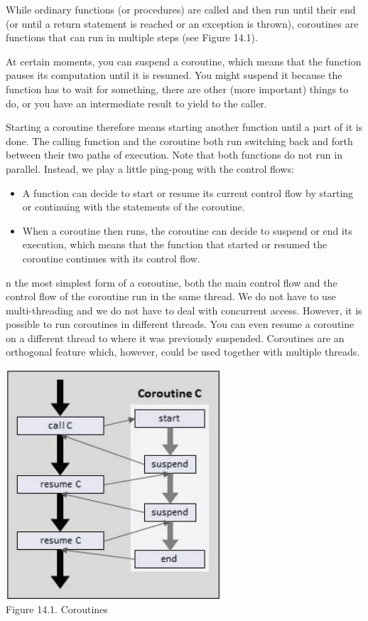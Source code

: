 While ordinary functions (or procedures) are called and then run until their end (or until a return statement is reached or an exception is thrown), coroutines are functions that can run in multiple steps (see Figure 14.1).

At certain moments, you can suspend a coroutine, which means that the function pauses its computation until it is resumed. You might suspend it because the function has to wait for something, there are other (more important) things to do, or you have an intermediate result to yield to the caller.

Starting a coroutine therefore means starting another function until a part of it is done. The calling function and the coroutine both run switching back and forth between their two paths of execution. Note that both functions do not run in parallel. Instead, we play a little ping-pong with the control flows:

\begin{itemize}
\item 
A function can decide to start or resume its current control flow by starting or continuing with the statements of the coroutine.

\item 
When a coroutine then runs, the coroutine can decide to suspend or end its execution, which means that the function that started or resumed the coroutine continues with its control flow.
\end{itemize}

n the most simplest form of a coroutine, both the main control flow and the control flow of the coroutine run in the same thread. We do not have to use multi-threading and we do not have to deal with concurrent access. However, it is possible to run coroutines in different threads. You can even resume a coroutine on a different thread to where it was previously suspended. Coroutines are an orthogonal feature which, however, could be used together with multiple threads.

\begin{center}
\includegraphics[width=0.6\textwidth]{content/chapter14/images/1.png}\\
Figure 14.1. Coroutines
\end{center}

